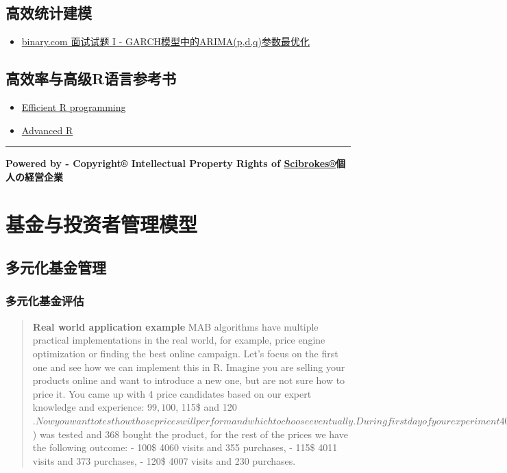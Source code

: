 \documentclass[]{book}
\providecommand{\tightlist}{%
  \setlength{\itemsep}{0pt}\setlength{\parskip}{0pt}}
\begin{document}
\section{高效统计建模}

\begin{itemize}
\tightlist
\item
  \href{http://rpubs.com/englianhu/binary-Q1FiGJRGARCH}{binary.com
  面试试题 I - GARCH模型中的ARIMA(p,d,q)参数最优化}
\end{itemize}

\section{高效率与高级R语言参考书}\label{r}

\begin{itemize}
\tightlist
\item
  \href{https://csgillespie.github.io/efficientR/}{Efficient R
  programming}
\item
  \href{http://adv-r.had.co.nz}{Advanced R}
\end{itemize}

\begin{center}\rule{0.5\linewidth}{\linethickness}\end{center}

\textbf{Powered by - Copyright® Intellectual Property Rights of
\href{http://www.scibrokes.com}{Scibrokes®}個人の経営企業}

\chapter{基金与投资者管理模型}\label{fund}

\section{多元化基金管理}

\subsection{多元化基金评估}

\begin{quote}
\textbf{Real world application example} MAB algorithms have multiple
practical implementations in the real world, for example, price engine
optimization or finding the best online campaign. Let's focus on the
first one and see how we can implement this in R. Imagine you are
selling your products online and want to introduce a new one, but are
not sure how to price it. You came up with 4 price candidates based on
our expert knowledge and experience: 99\(, 100\), 115\$ and
120\(. Now you want to test how those prices will perform and which to choose eventually. During first day of your experiment 4000 people visited your shop when the first price (99\))
was tested and 368 bought the product, for the rest of the prices we
have the following outcome: - 100\$ 4060 visits and 355 purchases, -
115\$ 4011 visits and 373 purchases, - 120\$ 4007 visits and 230
purchases.
\end{quote}
\end{document}
